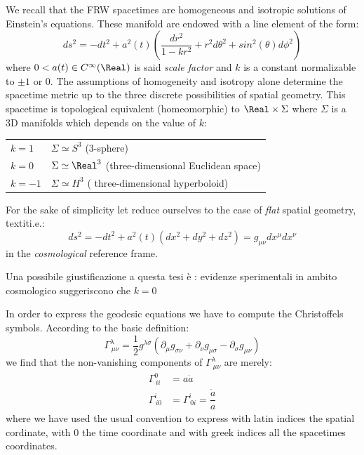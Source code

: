 \documentclass[Main]{subfiles}
\begin{document}
	We recall that the FRW spacetimes are homogeneous and isotropic solutions of Einstein’s equations.
	These manifold are endowed with a line element of the form:
	\begin{equation}
		ds^2 = -dt^2 + a^2(t) \left( \frac{dr^2}{1-k r^2} + r^2 d\theta^2 + sin^2(\theta) d\phi^2\right)
	\end{equation}
		where $0 < a(t) \in C^\infty	(\Real)$ is said \emph{scale factor} and $k$ is a constant normalizable to $\pm 1$ or $0$.
		The assumptions of homogeneity and isotropy alone determine the spacetime metric up to the three discrete possibilities of spatial geometry.
		This spacetime is topological equivalent (homeomorphic) to $\Real \times \Sigma$ where $\Sigma$ is a 3D manifolds which depends on the value of $k$:
		\begin{center}\begin{tabular}{l l}
			$k = 1$ & $\Sigma \simeq S^3$ (3-sphere)\\
			$k = 0$ & $\Sigma \simeq \Real^3$ (three-dimensional Euclidean space)\\
			$k = -1$ & $\Sigma \simeq H^3$ ( three-dimensional hyperboloid)\\		
		\end{tabular}\end{center}
		\vspace{2mm}
		
		For the sake of simplicity let reduce ourselves to the case of \emph{flat} spatial geometry, \\textit{i.e.}:
		\begin{displaymath}
			ds^2 = -dt^2 + a^2(t) \left( dx^2 + dy^2 + dz^2\right) = g_{\mu \nu} dx^\mu dx^\nu
		\end{displaymath}
		in the \emph{cosmological} reference frame.
\ifToninus
	\begin{Warning}
		Una possibile giustificazione a questa tesi è : evidenze sperimentali in ambito cosmologico suggeriscono che $k=0$
	\end{Warning}
\fi


		In order to express the geodesic equations we have to compute the Christoffels symbols. According to the basic definition:
		\begin{displaymath}
			\Gamma^\lambda_{\, \mu \nu} = \frac{1}{2} g^{\lambda \sigma } \left( \partial_\mu g_{\sigma \nu} + \partial_\nu g_{\mu \sigma} - \partial_{\sigma}g_{\mu \nu} \right)
		\end{displaymath}
		we find that the non-vanishing components of $\Gamma^\lambda_{\, \mu \nu}$ are merely:
			\begin{eqnarray}
				\Gamma^0_{\, i i} &= a \dot{a} \\
				\Gamma^i_{\, i 0} &= \Gamma^i_{\, 0 i} = \dfrac{\dot{a}}{a}
			\end{eqnarray}
			where we have used the usual convention to express with latin indices the spatial cordinate, with $0$ the time coordinate and with greek indices all the spacetimes coordinates.
			
\end{document}
